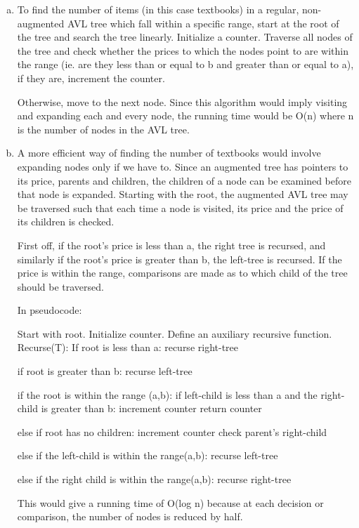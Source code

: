 \documentclass[12pt]{article}
\begin{document}
\begin{enumerate}[(a)]

\item


To find the number of items (in this case textbooks) in a regular, non-augmented AVL tree which fall  within a specific range, start at the root of the tree and search the tree linearly. Initialize a counter. Traverse all nodes of the tree and check whether the prices to which the nodes point to are within the range (ie. are they less than or equal to b and greater than or equal to a), if they are, increment the counter. 

Otherwise, move to the next node. Since this algorithm would imply visiting and expanding each and every node, the running time would be O(n) where n is the number of nodes in the AVL tree.


\item

	
	
A more efficient way of finding the number of textbooks would involve expanding nodes only if we have to. Since an augmented tree has pointers to its price, parents and children, the children of a node can be examined before that node is expanded. Starting with the root, the augmented AVL tree may be traversed such that each time a node is visited, its price and the price of its children is checked. 

First off, if the root's price is less than a, the right tree is recursed, and similarly if the root's price is greater than b, the left-tree is recursed. If the price is within the range, comparisons are made as to which child of the tree should be traversed.

In pseudocode:

Start with root.
Initialize counter.
Define an auxiliary recursive function.
Recurse(T):
If root is less than a:
	recurse right-tree

if root  is greater than b:
        recurse left-tree

if the root is within the range (a,b):
	if left-child is less than a and the right-child is greater than b:
		increment counter
		return counter
		
	else if root has no children:
		increment counter
		check parent's right-child
		
	else if the left-child is within the range(a,b):
		recurse left-tree
		 
	else if the right child is within the range(a,b):
		recurse right-tree
		
This would give a running time of O(log n) because at each decision or comparison, the number of nodes is reduced by half.
\end{enumerate}
\end{document}

